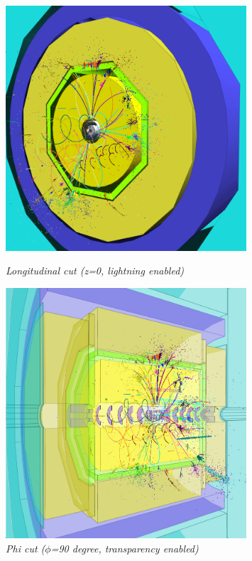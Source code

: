 \documentclass[a4paper,10pt]{article}
\begin{document}
\begin{figure}
\begin{minipage}[t]{6cm}
\centerline{\includegraphics[width=0.8\textwidth]{img/zcut.png}}
\caption{\label{CEDViewer} \textsl{Longitudinal cut (z=0, lightning enabled)}}
\end{minipage}
\begin{minipage}[t]{6cm}
\setlength{\fboxsep}{0mm}
\centerline{\includegraphics[width=0.8\textwidth]{img/phicut.png}}
\caption{\label{DSTViewer}\textsl{Phi cut ($\phi$=90 degree, transparency enabled)}}
\end{minipage}
\end{figure}
\end{document}
